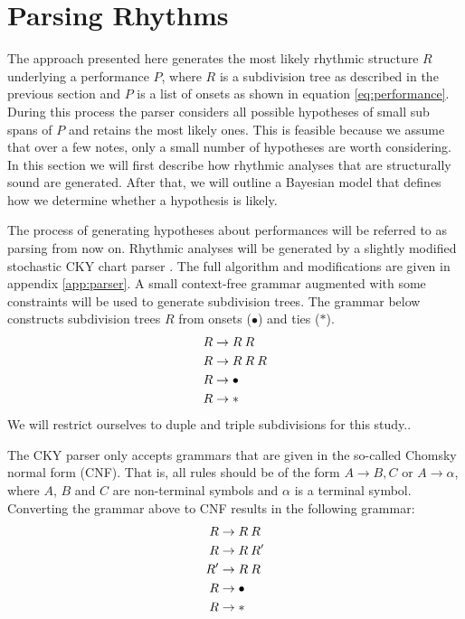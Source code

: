 \section{Parsing Rhythms}
\label{sec:parser}

The approach presented here generates the most likely rhythmic structure $R$ underlying a performance $P$, where $R$ is a subdivision tree as described in the previous section and $P$ is a list of onsets as shown in equation \ref{eq:performance}. During this process the parser considers all possible hypotheses of small sub spans of $P$ and retains the most likely ones. This is feasible because we assume that over a few notes, only a small number of hypotheses are worth considering. In this section we will first describe how rhythmic analyses that are structurally sound are generated. After that, we will outline a Bayesian model that defines how we determine whether a hypothesis is likely.

The process of generating hypotheses about performances will be referred to as parsing from now on. Rhythmic analyses will be generated by a slightly modified stochastic CKY chart parser \citep{Younger1967recognition}. The full algorithm and modifications are given in appendix \ref{app:parser}. A small context-free grammar augmented with some constraints will be used to generate subdivision trees. The grammar below constructs subdivision trees $R$ from onsets ($\bullet$) and ties ($*$).
\begin{align}
R &\rightarrow R\: R\\ \notag
R &\rightarrow R\: R\: R\\ \notag
R &\rightarrow \bullet\\ \notag
R &\rightarrow * \notag
\end{align}
We will restrict ourselves to duple and triple subdivisions for this study..

The CKY parser only accepts grammars that are given in the so-called Chomsky normal form (CNF). That is, all rules should be of the form $A \rightarrow B, C$ or $A \rightarrow \alpha$, where $A$, $B$ and $C$ are non-terminal symbols and $\alpha$ is a terminal symbol. Converting the grammar above to CNF results in the following grammar:
\begin{align}
\label{eq:grammar_cnf}
R &\rightarrow R\: R\\ \notag
R &\rightarrow R\: R'\\ \notag
R' &\rightarrow R\: R\\ \notag
R &\rightarrow \bullet\\ \notag
R &\rightarrow * \notag
\end{align}

